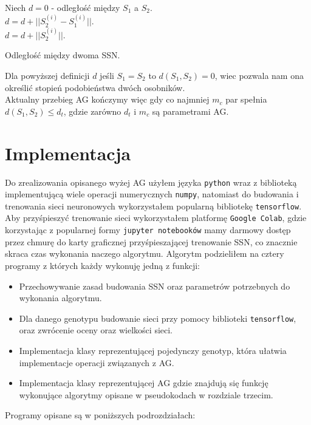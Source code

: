 \documentclass{article}
\begin{document}
\begin{algorithm}[H]
	Niech $d = 0$ - odległość między $S_1$ a $S_2$.\\
	 {
		$d = d + ||S_2^{(i)} - S_1^{(i)}||$.\\
	}
	 {
		$d = d + ||S_2^{(i)}||$.\\
	}
	\caption{Odległość między dwoma SSN.}
\end{algorithm}

Dla powyższej definicji $d$ jeśli $S_1 = S_2$ to $d(S_1, S_2) = 0$, wiec pozwala nam ona określić
stopień podobieństwa dwóch osobników.\\
Aktualny przebieg AG kończymy więc gdy co najmniej $m_c$ par spełnia $d(S_1, S_2) \leq d_t$,
gdzie zarówno $d_t$ i $m_c$ są parametrami AG.


\section{Implementacja}
Do zrealizowania opisanego wyżej AG użyłem języka \texttt{python} wraz z biblioteką 
implementującą wiele operacji numerycznych \texttt{numpy}, natomiast do budowania i trenowania
sieci neuronowych wykorzystałem popularną bibliotekę \texttt{tensorflow}. Aby przyśpieszyć
trenowanie sieci wykorzystałem platformę \texttt{Google Colab}, gdzie korzystając z popularnej
formy \texttt{jupyter notebooków} mamy darmowy dostęp przez chmurę do karty graficznej
przyśpieszającej trenowanie SSN, co znacznie skraca czas wykonania naczego algorytmu.
Algorytm podzieliłem na cztery programy z których każdy wykonuję jedną z funkcji:
\begin{itemize}
\item Przechowywanie zasad budowania SSN oraz parametrów potrzebnych do wykonania algorytmu.
\item Dla danego genotypu budowanie sieci przy pomocy biblioteki \texttt{tensorflow}, oraz
zwrócenie oceny oraz wielkości sieci.
\item Implementacja klasy reprezentującej pojedynczy genotyp, która ułatwia implementacje
operacji związanych z AG.
\item Implementacja klasy reprezentującej AG gdzie znajdują się funkcję wykonujące algorytmy
opisane w pseudokodach w rozdziale trzecim.
\end{itemize}
Programy opisane są w poniższych podrozdziałach:\\
\end{document}
